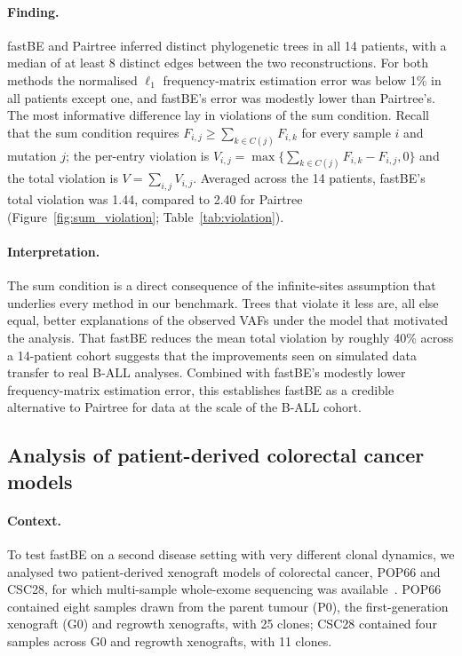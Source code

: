 \documentclass[11pt]{article}
\begin{document}
\paragraph{Finding.}
fastBE and Pairtree inferred distinct phylogenetic trees in all 14 patients, with a median of at least 8 distinct edges between the two reconstructions. For both methods the normalised $\ell_1$ frequency-matrix estimation error was below 1\% in all patients except one, and fastBE's error was modestly lower than Pairtree's. The most informative difference lay in violations of the sum condition. Recall that the sum condition requires $F_{i,j}\geq \sum_{k\in C(j)} F_{i,k}$ for every sample $i$ and mutation $j$; the per-entry violation is $V_{i,j}=\max\{\sum_{k\in C(j)} F_{i,k} - F_{i,j}, 0\}$ and the total violation is $V = \sum_{i,j} V_{i,j}$. Averaged across the 14 patients, fastBE's total violation was 1.44, compared to 2.40 for Pairtree (Figure~\ref{fig:sum_violation}; Table~\ref{tab:violation}).

\paragraph{Interpretation.}
The sum condition is a direct consequence of the infinite-sites assumption that underlies every method in our benchmark. Trees that violate it less are, all else equal, better explanations of the observed VAFs under the model that motivated the analysis. That fastBE reduces the mean total violation by roughly 40\% across a 14-patient cohort suggests that the improvements seen on simulated data transfer to real B-ALL analyses. Combined with fastBE's modestly lower frequency-matrix estimation error, this establishes fastBE as a credible alternative to Pairtree for data at the scale of the B-ALL cohort.

\subsection{Analysis of patient-derived colorectal cancer models}

\paragraph{Context.}
To test fastBE on a second disease setting with very different clonal dynamics, we analysed two patient-derived xenograft models of colorectal cancer, POP66 and CSC28, for which multi-sample whole-exome sequencing was available~\citep{rehman2021diapause,ulintz2018polyclonal}. POP66 contained eight samples drawn from the parent tumour (P0), the first-generation xenograft (G0) and regrowth xenografts, with 25 clones; CSC28 contained four samples across G0 and regrowth xenografts, with 11 clones.
\end{document}
